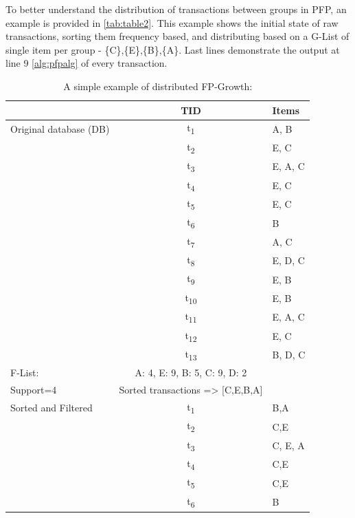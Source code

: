 To better understand the distribution of transactions between groups in PFP, an example is provided in \autoref{tab:table2}. This example shows the initial state of raw transactions, sorting them frequency based, and distributing based on a G-List of single item per group - \{C\},\{E\},\{B\},\{A\}. Last lines demonstrate the output at line 9 \autoref{alg:pfpalg} of every transaction. 

\begin{table}[H]
  \begin{center}
    \caption{A simple example of distributed FP-Growth:}
    \label{tab:table2}
    \begin{tabular}{l|c|l} %
      \textbf{} & \textbf{TID} & \textbf{Items}\\
      \hline
      Original database (DB) & t\textsubscript{1} & {A, B}\\
       & t\textsubscript{2} & {E, C}\\
        & t\textsubscript{3} & {E, A, C}\\
	   & t\textsubscript{4} & {E, C}\\
       & t\textsubscript{5} & {E, C}\\
        & t\textsubscript{6} & {B}\\
	   & t\textsubscript{7} & {A, C}\\
       & t\textsubscript{8} & {E, D, C}\\
        & t\textsubscript{9} &{E, B} \\
	   & t\textsubscript{10} & {E, B}\\
       & t\textsubscript{11} & {E, A, C}\\
        & t\textsubscript{12} & {E, C}\\
	   & t\textsubscript{13} & {B, D, C}\\
	  F-List: & A: 4, E: 9, B: 5, C: 9, D: 2 & \\
	  		\hline
	  Support=4 & Sorted transactions => [C,E,B,A] & \\
	  		\hline
	  Sorted and Filtered & t\textsubscript{1} & {B,A}\\
       & t\textsubscript{2} & {C,E}\\
        & t\textsubscript{3} & {C, E, A}\\
	   & t\textsubscript{4} & {C,E}\\
       & t\textsubscript{5} & {C,E}\\
        & t\textsubscript{6} & {B}\\

\end{tabular}
\end{center}
\end{table}
